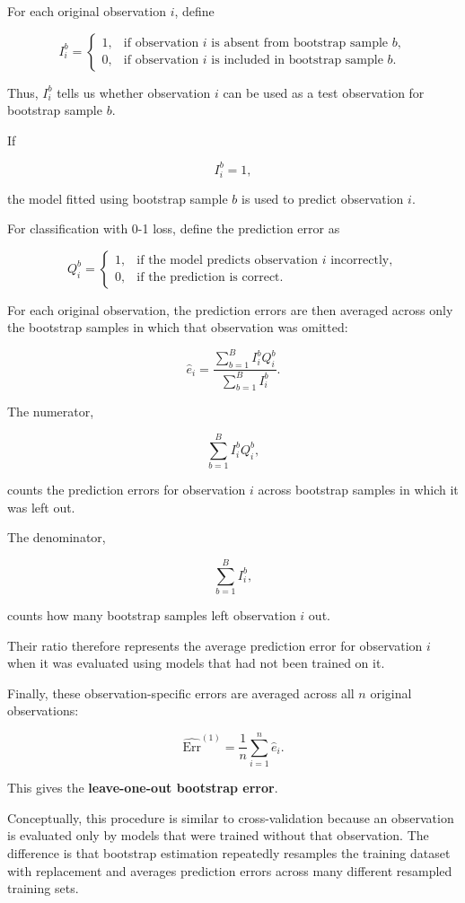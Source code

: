\documentclass[
  letterpaper,
  DIV=11,
  numbers=noendperiod]{scrreprt}
\begin{document}
For each original observation \(i\), define

\[
I_i^b
=
\begin{cases}
1, & \text{if observation } i \text{ is absent from bootstrap sample } b,\\
0, & \text{if observation } i \text{ is included in bootstrap sample } b.
\end{cases}
\]

Thus, \(I_i^b\) tells us whether observation \(i\) can be used as a test
observation for bootstrap sample \(b\).

If

\[
I_i^b=1,
\]

the model fitted using bootstrap sample \(b\) is used to predict
observation \(i\).

For classification with 0-1 loss, define the prediction error as

\[
Q_i^b
=
\begin{cases}
1, & \text{if the model predicts observation } i \text{ incorrectly},\\
0, & \text{if the prediction is correct}.
\end{cases}
\]

For each original observation, the prediction errors are then averaged
across only the bootstrap samples in which that observation was omitted:

\[
\widehat{e}_i
=
\frac{
\sum_{b=1}^{B} I_i^b Q_i^b
}{
\sum_{b=1}^{B} I_i^b
}.
\]

The numerator,

\[
\sum_{b=1}^{B} I_i^b Q_i^b,
\]

counts the prediction errors for observation \(i\) across bootstrap
samples in which it was left out.

The denominator,

\[
\sum_{b=1}^{B} I_i^b,
\]

counts how many bootstrap samples left observation \(i\) out.

Their ratio therefore represents the average prediction error for
observation \(i\) when it was evaluated using models that had not been
trained on it.

Finally, these observation-specific errors are averaged across all \(n\)
original observations:

\[
\widehat{\mathrm{Err}}^{(1)}
=
\frac{1}{n}
\sum_{i=1}^{n}
\widehat{e}_i.
\]

This gives the \textbf{leave-one-out bootstrap error}.

Conceptually, this procedure is similar to cross-validation because an
observation is evaluated only by models that were trained without that
observation. The difference is that bootstrap estimation repeatedly
resamples the training dataset with replacement and averages prediction
errors across many different resampled training sets.
\end{document}
